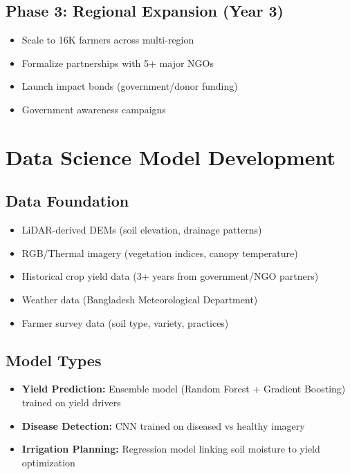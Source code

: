 \subsection{Phase 3: Regional Expansion (Year 3)}

\begin{itemize}
    \item Scale to 16K farmers across multi-region
    \item Formalize partnerships with 5+ major NGOs
    \item Launch impact bonds (government/donor funding)
    \item Government awareness campaigns
\end{itemize}

\section{Data Science Model Development}

\subsection{Data Foundation}

\begin{itemize}
    \item LiDAR-derived DEMs (soil elevation, drainage patterns)
    \item RGB/Thermal imagery (vegetation indices, canopy temperature)
    \item Historical crop yield data (3+ years from government/NGO partners)
    \item Weather data (Bangladesh Meteorological Department)
    \item Farmer survey data (soil type, variety, practices)
\end{itemize}

\subsection{Model Types}

\begin{itemize}
    \item \textbf{Yield Prediction:} Ensemble model (Random Forest + Gradient Boosting) trained on yield drivers
    \item \textbf{Disease Detection:} CNN trained on diseased vs healthy imagery
    \item \textbf{Irrigation Planning:} Regression model linking soil moisture to yield optimization
\end{itemize}

